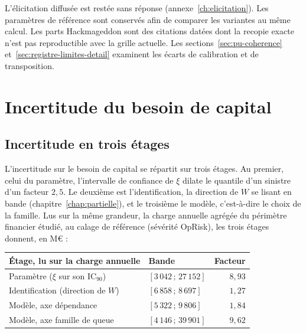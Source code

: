 L'élicitation diffusée est restée sans réponse (annexe~\ref{ch:elicitation}). Les paramètres de
référence sont conservés afin de comparer les variantes au même calcul.
Les parts Hackmageddon sont des citations datées dont la recopie exacte n'est pas reproductible
avec la grille actuelle. Les sections~\ref{sec:pu-coherence} et~\ref{sec:registre-limites-detail}
examinent les écarts de calibration et de transposition.

\section{Incertitude du besoin de capital}

\subsection{Incertitude en trois étages}
\label{sec:trois-etages}
\label{sec:etage-modele-hors-bande}

L'incertitude sur le besoin de capital se répartit sur trois étages. Au premier, celui du paramètre, l'intervalle
de confiance de $\xi$ dilate le quantile d'un sinistre d'un facteur $2{,}5$. Le deuxième est
l'identification, la direction de $W$ se lisant en bande (chapitre~\ref{chap:partielle}), et le
troisième le modèle, c'est-à-dire le choix de la famille. Lus sur la même grandeur, la charge annuelle
agrégée du périmètre financier étudié, au calage de référence (sévérité OpRisk), les trois étages donnent, en M\euro{} :

\begin{center}\footnotesize
\renewcommand{\arraystretch}{1.25}
\begin{tabular}{@{}l l r@{}}
\toprule
\textbf{Étage, lu sur la charge annuelle} & \textbf{Bande} & \textbf{Facteur} \\
\midrule
Paramètre ($\xi$ sur son IC$_{90}$) & $[3\,042\,;\,27\,152]$ & $8{,}93$ \\
Identification (direction de $W$) & $[6\,858\,;\,8\,697]$ & $1{,}27$ \\
Modèle, axe dépendance & $[5\,322\,;\,9\,806]$ & $1{,}84$ \\
Modèle, axe famille de queue & $[4\,146\,;\,39\,901]$ & $9{,}62$ \\
\bottomrule
\end{tabular}
\end{center}

